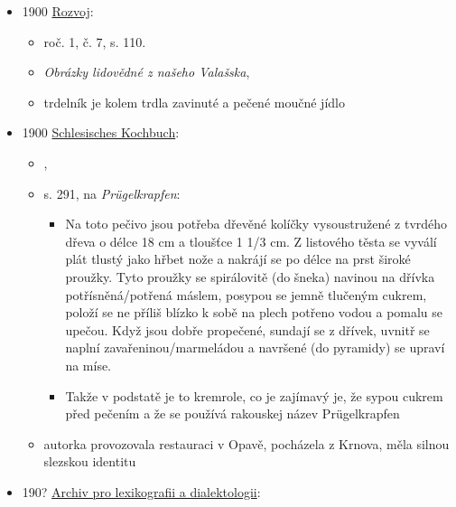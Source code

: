 \begin{itemize}
\begin{itemize}
    \begin{itemize}
    \tightlist
    \item
      Všecko se do něho vešlo: i koblihy i trdelníky, jitrnice a celé
      šrútky --- vším chasa brala za vděk
    \end{itemize}
  \end{itemize}
\item
  1900
  \href{https://www.digitalniknihovna.cz/knav/uuid/uuid:948b6efe-c3b4-42d6-83bd-d081d81d61b1}{Rozvoj}:

  \begin{itemize}
  \tightlist
  \item
    roč. 1, č. 7, s. 110.
  \item
    \emph{Obrázky lidovědné z našeho Valašska},
  \item
    trdelník je kolem trdla zavinuté a pečené moučné jídlo
  \end{itemize}
\item
  1900
  \href{http://digital.slub-dresden.de/id312407033/305}{Schlesisches
  Kochbuch}:

  \begin{itemize}
  \tightlist
  \item
     , 
  \item
    s. 291,  na \emph{Prügelkrapfen}:

    \begin{itemize}
    \tightlist
    \item
      Na toto pečivo jsou potřeba dřevěné kolíčky vysoustružené z
      tvrdého dřeva o délce 18 cm a tloušťce 1 1/3 cm. Z listového těsta
      se vyválí plát tlustý jako hřbet nože a nakrájí se po délce na
      prst široké proužky. Tyto proužky se spirálovitě (do šneka)
      navinou na dřívka potřísněná/potřená máslem, posypou se jemně
      tlučeným cukrem, položí se ne příliš blízko k sobě na plech
      potřeno vodou a pomalu se upečou. Když jsou dobře propečené,
      sundají se z dřívek, uvnitř se naplní zavařeninou/marmeládou a
      navršené (do pyramidy) se upraví na míse.
    \item
      Takže v podstatě je to kremrole, co je zajímavý je, že sypou
      cukrem před pečením a že se používá rakouskej název Prügelkrapfen
    \end{itemize}
  \item
    autorka provozovala restauraci v Opavě, pocházela z Krnova, měla
    silnou slezskou identitu
  \end{itemize}
\item
  190?
  \href{https://ceskadigitalniknihovna.cz/uuid/uuid:225c96bf-3ac7-4d81-addb-3ab9562be388}{Archiv
  pro lexikografii a dialektologii}:


\end{itemize}
